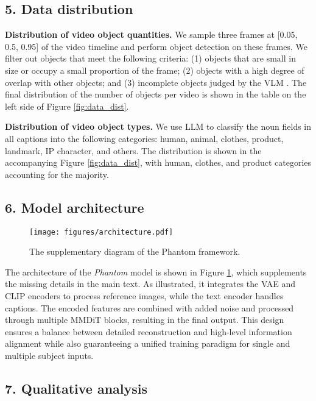 \subsection*{5. Data distribution}
\textbf{Distribution of video object quantities.} We sample three frames at [0.05, 0.5, 0.95] of the video timeline and perform object detection on these frames. We filter out objects that meet the following criteria: (1) objects that are small in size or occupy a small proportion of the frame; (2) objects with a high degree of overlap with other objects; and (3) incomplete objects judged by the VLM \cite{Qwen2.5-VL}. The final distribution of the number of objects per video is shown in the table on the left side of Figure \ref{fig:data_dist}.

\noindent \textbf{Distribution of video object types.} We use LLM \cite{GPT4} to classify the noun fields in all captions into the following categories: human, animal, clothes, product, landmark, IP character, and others. The distribution is shown in the accompanying Figure \ref{fig:data_dist}, with human, clothes, and product categories accounting for the majority.

\subsection*{6. Model architecture}
\label{sec:supp:model}

\begin{figure}[t]
	\centering
	\texttt{[image: figures/architecture.pdf]} 
	\caption{The supplementary diagram of the Phantom framework.}
	\label{fig:architecture}
\end{figure}
The architecture of the \textit{Phantom} model is shown in Figure \ref{fig:architecture}, which supplements the missing details in the main text. As illustrated, it integrates the VAE and CLIP encoders to process reference images, while the text encoder handles captions. The encoded features are combined with added noise and processed through multiple MMDiT blocks, resulting in the final output. This design ensures a balance between detailed reconstruction and high-level information alignment while also guaranteeing a unified training paradigm for single and multiple subject inputs.


\subsection*{7. Qualitative analysis}
\label{sec:supp:qualitative}

